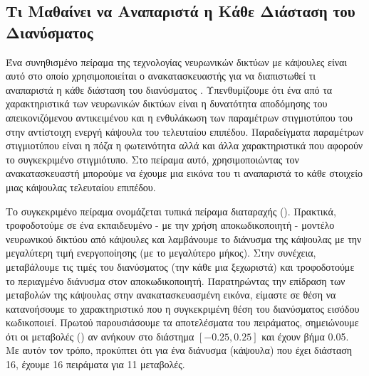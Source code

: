 \subsection{Τι Μαθαίνει να Αναπαριστά η Κάθε Διάσταση του Διανύσματος }
Ένα συνηθισμένο πείραμα της τεχνολογίας νευρωνικών δικτύων με κάψουλες είναι αυτό στο οποίο χρησιμοποιείται ο ανακατασκευαστής για να διαπιστωθεί τι αναπαριστά η κάθε διάσταση του διανύσματος . Υπενθυμίζουμε ότι ένα από τα χαρακτηριστικά των νευρωνικών δικτύων είναι η δυνατότητα αποδόμησης του απεικονιζόμενου αντικειμένου και η ενθυλάκωση των παραμέτρων στιγμιοτύπου του στην αντίστοιχη ενεργή κάψουλα του τελευταίου επιπέδου. Παραδείγματα παραμέτρων στιγμιοτύπου είναι η πόζα η φωτεινότητα αλλά και άλλα χαρακτηριστικά που αφορούν το συγκεκριμένο στιγμιότυπο. Στο πείραμα αυτό, χρησιμοποιώντας τον ανακατασκευαστή μπορούμε να έχουμε μια εικόνα του τι αναπαριστά το κάθε στοιχείο μιας κάψουλας τελευταίου επιπέδου.\par

Το συγκεκριμένο πείραμα ονομάζεται τυπικά πείραμα διαταραχής (). Πρακτικά, τροφοδοτούμε σε ένα εκπαιδευμένο - με την χρήση αποκωδικοποιητή - μοντέλο νευρωνικού δικτύου από κάψουλες και λαμβάνουμε το διάνυσμα της κάψουλας  με την μεγαλύτερη τιμή ενεργοποίησης (με το μεγαλύτερο μήκος). Στην συνέχεια, μεταβάλουμε τις τιμές του διανύσματος (την κάθε μια ξεχωριστά) και τροφοδοτούμε το περιαγμένο διάνυσμα στον αποκωδικοποιητή. Παρατηρώντας την επίδραση των μεταβολών της κάψουλας στην ανακατασκευασμένη εικόνα, είμαστε σε θέση να  κατανοήσουμε το χαρακτηριστικό που η συγκεκριμένη θέση του διανύσματος εισόδου κωδικοποιεί. Πρωτού παρουσιάσουμε τα αποτελέσματα του πειράματος, σημειώνουμε ότι οι μεταβολές () αν ανήκουν στο διάστημα $[-0.25, 0.25]$ και έχουν βήμα 0.05. Με αυτόν τον τρόπο, προκύπτει ότι για ένα διάνυσμα (κάψουλα) που έχει διάσταση 16, έχουμε 16 πειράματα για 11 μεταβολές.\par

